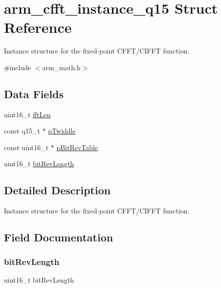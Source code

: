 \hypertarget{structarm__cfft__instance__q15}{}\section{arm\+\_\+cfft\+\_\+instance\+\_\+q15 Struct Reference}
\label{structarm__cfft__instance__q15}


Instance structure for the fixed-\/point C\+F\+F\+T/\+C\+I\+F\+FT function.  




{\ttfamily \#include $<$arm\+\_\+math.\+h$>$}

\subsection*{Data Fields}
\begin{DoxyCompactItemize}
\item 
uint16\+\_\+t \mbox{\hyperlink{structarm__cfft__instance__q15_ab8db3bbe7c61e6bb8ca2a55e3446e11a}{fft\+Len}}
\item 
const q15\+\_\+t $\ast$ \mbox{\hyperlink{structarm__cfft__instance__q15_a7f19217cfa0370f9e518caa882265386}{p\+Twiddle}}
\item 
const uint16\+\_\+t $\ast$ \mbox{\hyperlink{structarm__cfft__instance__q15_a3b229432d381b0a511a9cdbe3aa74e78}{p\+Bit\+Rev\+Table}}
\item 
uint16\+\_\+t \mbox{\hyperlink{structarm__cfft__instance__q15_a65e1b3e327b8fab9404287ed8f347cc8}{bit\+Rev\+Length}}
\end{DoxyCompactItemize}


\subsection{Detailed Description}
Instance structure for the fixed-\/point C\+F\+F\+T/\+C\+I\+F\+FT function. 

\subsection{Field Documentation}
\mbox{\label{structarm__cfft__instance__q15_a65e1b3e327b8fab9404287ed8f347cc8}} 
\subsubsection{\texorpdfstring{bitRevLength}{bitRevLength}}
{\footnotesize\ttfamily uint16\+\_\+t bit\+Rev\+Length}

